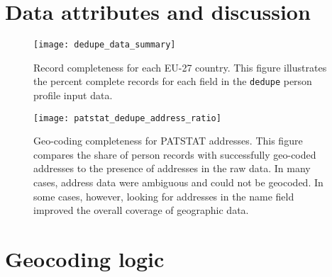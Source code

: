 \documentclass[11pt]{article}
\begin{document}





\appendix

\section{Data attributes and discussion}
\label{sec:data-attr-disc}

\begin{figure}[ht]
  \centering
  \texttt{[image: dedupe\_data\_summary]}
  \caption{Record completeness for each EU-27 country. This figure illustrates the percent complete records for each field in the \texttt{dedupe} person profile input data. }
  \label{fig:profile-completeness}
\end{figure}

\begin{figure}[ht]
  \centering
  \texttt{[image: patstat\_dedupe\_address\_ratio]}
  \caption{Geo-coding completeness for PATSTAT addresses. This figure compares the share of person records with successfully geo-coded addresses to the presence of addresses in the raw data. In many cases, address data were ambiguous and could not be geocoded. In some cases, however, looking for addresses in the name field improved the overall coverage of geographic data. }
  \label{fig:addr-geocoded-shares}
\end{figure}

\FloatBarrier
\section{Geocoding logic}
\label{sec:geocoding-logic}
\end{document}
